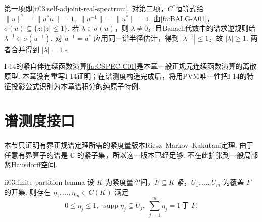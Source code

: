 \begin{FAProof}
第一项即\autoref{ii03:self-adjoint-real-spectrum}. 对第二项，\(\displaystyle C^*\)恒等式给
\(\displaystyle \|u\|^2=\|u^*u\|=1, \; \|u^{-1}\|=\|u^*\|=1.\)
由\autoref{fa:BALG-A01}，\(\displaystyle\sigma(u)\subseteq\{z:|z|\leqslant1\}\). 若 \(\displaystyle\lambda\in\sigma(u)\)，则 \(\displaystyle\lambda\neq0\)，且Banach代数中的谱求逆规则给 \(\displaystyle\lambda^{-1}\in\sigma(u^{-1})\). 对 \(\displaystyle u^{-1}=u^*\) 应用同一谱半径估计，得到 \(\displaystyle|\lambda^{-1}|\leqslant1\)，故 \(\displaystyle|\lambda|\geqslant1\). 两者合并得到 \(\displaystyle|\lambda|=1\).\hfill\(\square\)
\end{FAProof}

\begin{FARemark}[I-14桥接]
I-14的紧自伴连续函数演算\autoref{fa:CSPEC-C01}是本章一般正规元连续函数演算的离散原型. 本章没有重写I-14证明；在谱测度构造完成后，将用PVM唯一性把I-14的特征投影公式识别为本章谱积分的纯原子特例.
\end{FARemark}

\section{谱测度接口}\label{sec:ii03-spectral-measure-interface}

本节只证明有界正规谱定理所需的紧度量版本Riesz--Markov--Kakutani定理. 由于任意有界算子的谱是 \(\displaystyle\mathbb C\) 的紧子集，所以这一版本已经足够. 不在此扩张到一般局部紧Hausdorff空间.

\begin{FALemma}[C][紧度量空间上的有限从属分割]{ii03:finite-partition-lemma}
设 \(\displaystyle K\) 为紧度量空间，\(\displaystyle F\subseteq K\) 紧，\(\displaystyle U_1,\dots,U_m\) 为覆盖 \(\displaystyle F\) 的开集. 则存在 \(\displaystyle\eta_1,\dots,\eta_m\in C(K)\) 满足
\[
0\leqslant\eta_j\leqslant1,
\;
\operatorname{supp}\eta_j\subseteq U_j,
\;
\sum_{j=1}^m\eta_j=1\ \text{于 }F.
\]
\end{FALemma}

